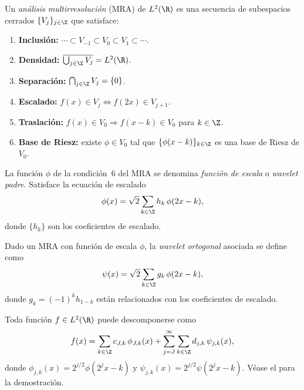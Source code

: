 \begin{definition}
\label{def:grids:mra}
Un \emph{an\'alisis multirresoluci\'on} (MRA) de $L^2(\R)$ es una secuencia de
subespacios cerrados $\{V_j\}_{j \in \Z}$ que satisface:
\begin{enumerate}
  \item \textbf{Inclusi\'on:} $\cdots \subset V_{-1} \subset V_0 \subset V_1 \subset \cdots$.
  \item \textbf{Densidad:} $\overline{\bigcup_{j \in \Z} V_j} = L^2(\R)$.
  \item \textbf{Separaci\'on:} $\bigcap_{j \in \Z} V_j = \{0\}$.
  \item \textbf{Escalado:} $f(x) \in V_j \Leftrightarrow f(2x) \in V_{j+1}$.
  \item \textbf{Traslaci\'on:} $f(x) \in V_0 \Rightarrow f(x-k) \in V_0$ para $k \in \Z$.
  \item \textbf{Base de Riesz:} existe $\phi \in V_0$ tal que
    $\{\phi(x-k)\}_{k \in \Z}$ es una base de Riesz de $V_0$.
\end{enumerate}
\end{definition}

\begin{definition}
\label{def:grids:scaling-function}
La funci\'on $\phi$ de la condici\'on~6 del MRA se denomina \emph{funci\'on de
escala} o \emph{wavelet padre}. Satisface la ecuaci\'on de escalado
\[
  \phi(x) = \sqrt{2} \sum_{k \in \Z} h_k\, \phi(2x - k),
\]
donde $\{h_k\}$ son los coeficientes de escalado.
\end{definition}

\begin{definition}
\label{def:grids:orthogonal-wavelet}
Dado un MRA con funci\'on de escala $\phi$, la \emph{wavelet ortogonal} asociada
se define como
\[
  \psi(x) = \sqrt{2} \sum_{k \in \Z} g_k\, \phi(2x - k),
\]
donde $g_k = (-1)^k h_{1-k}$ est\'an relacionados con los coeficientes de
escalado.
\end{definition}

\begin{theorem}
\label{thm:grids:wavelet-decomposition}
Toda funci\'on $f \in L^2(\R)$ puede descomponerse como
\[
  f(x) = \sum_{k \in \Z} c_{J,k}\, \phi_{J,k}(x)
   + \sum_{j=J}^{\infty} \sum_{k \in \Z} d_{j,k}\, \psi_{j,k}(x),
\]
donde $\phi_{j,k}(x) = 2^{j/2} \phi(2^j x - k)$ y
$\psi_{j,k}(x) = 2^{j/2} \psi(2^j x - k)$. V\'ease el  para la
demostraci\'on.
\end{theorem}

